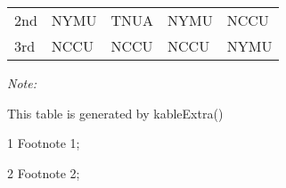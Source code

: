 \begin{table}
\begin{threeparttable}
\begin{tabular}[t]{lllll}
\hspace{1em}2nd & NYMU & TNUA & NYMU & NCCU\\
\hspace{1em}3rd & NCCU & NCCU & NCCU & NYMU\\
\bottomrule
\end{tabular}
\begin{tablenotes}
\item \textit{Note: } 
\item This table is generated by kableExtra()
\item[1] Footnote 1; 
\item[2] Footnote 2; 
\end{tablenotes}
\end{threeparttable}
\end{table}
